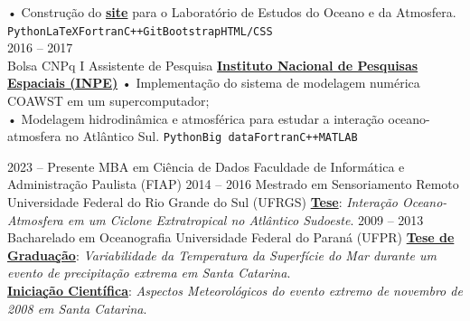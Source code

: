 \documentclass[9pt]{developercv} %
\begin{document}
\begin{entrylist}
{		• Construção do \href{https://loa-inpe.github.io/}{\textcolor{bleu_cite}{\textbf{site}}} para o Laboratório de Estudos do Oceano e da Atmosfera. \\
		\texttt{Python}\slashsep\texttt{LaTeX}\slashsep\texttt{Fortran}\slashsep\texttt{C++}\slashsep\texttt{Git}\slashsep\texttt{Bootstrap}\slashsep\texttt{HTML/CSS}}
		\\\entry
		{2016 -- 2017\\\footnotesize{Bolsa CNPq I}}
		{Assistente de Pesquisa}
		{\href{https://www.gov.br/inpe/pt-br}{\textcolor{bleu_cite}{\textbf{Instituto Nacional de Pesquisas Espaciais (INPE)}}}}
		{• Implementação do sistema de modelagem numérica COAWST em um supercomputador; \\
		 • Modelagem hidrodinâmica e atmosférica para estudar a interação oceano-atmosfera no Atlântico Sul. 
		\texttt{Python}\slashsep\texttt{Big data}\slashsep\texttt{Fortran}\slashsep\texttt{C++}\slashsep\texttt{MATLAB}}
\end{entrylist}

\vspace{-0.5cm}

\begin{entrylist}
	\entry
		{2023 -- Presente}
		{MBA em Ciência de Dados}
		{Faculdade de Informática e Administração Paulista (FIAP)}
		{}
		\entry
		{2014 -- 2016}
		{Mestrado em Sensoriamento Remoto}
		{Universidade Federal do Rio Grande do Sul (UFRGS)}
		{\href{https://lume.ufrgs.br/handle/10183/171223}{\textcolor{bleu_cite}{\textbf{Tese}}}: \textit{Interação Oceano-Atmosfera em um Ciclone Extratropical no Atlântico Sudoeste}.}
	\entry
		{2009 -- 2013}
		{Bacharelado em Oceanografia}
		{Universidade Federal do Paraná (UFPR)}
		{\href{http://doi.org/10.13140/RG.2.2.15184.35847}{\textcolor{bleu_cite}{\textbf{Tese de Graduação}}}: \textit{Variabilidade da Temperatura da Superfície do Mar durante um evento de precipitação extrema em Santa Catarina}. 
		\\ \href{http://doi.org/10.13140/RG.2.2.25250.68800}{\textcolor{bleu_cite}{\textbf{Iniciação Científica}}}: \textit{Aspectos Meteorológicos do evento extremo de novembro de 2008 em Santa Catarina}.
		}
\end{entrylist}
\end{document}
